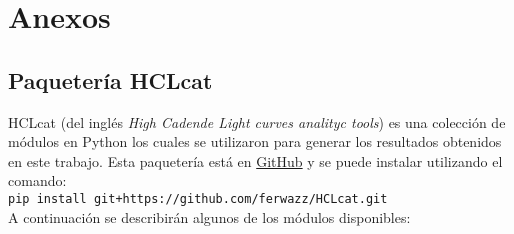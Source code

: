 \chapter*{\textbf{Anexos}}
\setcounter{chapter}{6}
\setcounter{equation}{0}
\setcounter{figure}{0}
\setcounter{table}{0}

\section*{Paquetería HCLcat}

HCLcat (del inglés \textit{High Cadende Light curves analityc tools}) es una colección de módulos en Python los cuales se utilizaron para generar los resultados obtenidos en este trabajo. Esta paquetería está en \href{https://github.com/ferwazz/HCLcat}{GitHub} y se puede instalar utilizando el comando:\\

\texttt{pip install git+https://github.com/ferwazz/HCLcat.git}\\

A continuación se describirán algunos de los módulos disponibles:\\

